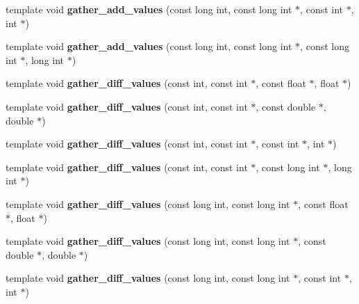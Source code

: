 \begin{DoxyCompactItemize}
template void {\bfseries gather\+\_\+add\+\_\+values} (const long int, const long int $\ast$, const int $\ast$, int $\ast$)
\item 
\mbox{\label{namespaceschwz_ac5b57e7bd1e1def39a59ebd97fdfbfb2}} 
template void {\bfseries gather\+\_\+add\+\_\+values} (const long int, const long int $\ast$, const long int $\ast$, long int $\ast$)
\item 
\mbox{\label{namespaceschwz_afbede3c73f67fb283f62517b71f93fe1}} 
template void {\bfseries gather\+\_\+diff\+\_\+values} (const int, const int $\ast$, const float $\ast$, float $\ast$)
\item 
\mbox{\label{namespaceschwz_af0bde8e5792d69e70e61eb8722f1b283}} 
template void {\bfseries gather\+\_\+diff\+\_\+values} (const int, const int $\ast$, const double $\ast$, double $\ast$)
\item 
\mbox{\label{namespaceschwz_af4c83d3aff6a056dc2e2da6397245c24}} 
template void {\bfseries gather\+\_\+diff\+\_\+values} (const int, const int $\ast$, const int $\ast$, int $\ast$)
\item 
\mbox{\label{namespaceschwz_a00aa4cb20044923725a71a96d1bd812c}} 
template void {\bfseries gather\+\_\+diff\+\_\+values} (const int, const int $\ast$, const long int $\ast$, long int $\ast$)
\item 
\mbox{\label{namespaceschwz_a76b4f4cf99358eb91f85f1a41f72cb1c}} 
template void {\bfseries gather\+\_\+diff\+\_\+values} (const long int, const long int $\ast$, const float $\ast$, float $\ast$)
\item 
\mbox{\label{namespaceschwz_a8a6322efe1ef6c5acda8d5673241ce55}} 
template void {\bfseries gather\+\_\+diff\+\_\+values} (const long int, const long int $\ast$, const double $\ast$, double $\ast$)
\item 
\mbox{\label{namespaceschwz_abf11ae3dd34298145fa6c6be53e9c62d}} 
template void {\bfseries gather\+\_\+diff\+\_\+values} (const long int, const long int $\ast$, const int $\ast$, int $\ast$)
\item 
\mbox{\label{namespaceschwz_a6b906ed90cfe429146cb1e253fe06116}} 

\end{DoxyCompactItemize}
